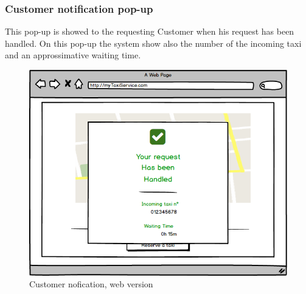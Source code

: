\documentclass{report}
\begin{document}
			
			\subsubsection{Customer notification pop-up}
			This pop-up is showed to the requesting Customer when his request has been handled. On this pop-up the system show also the number of the incoming taxi and an approssimative 				waiting time.
			
				\begin{figure}[H]
					\centering
					\includegraphics[scale=0.5]{IMG/UserInterfaces/customerNotification.png}
					\caption{Customer nofication, web version}\label{visina8}
				\end{figure}
\end{document}
